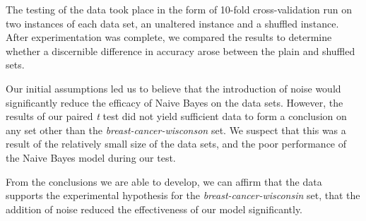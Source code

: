 \documentclass[twoside,11pt]{article}
\begin{document}
	The testing of the data took place in the form of 10-fold cross-validation run on two instances of each data set, an unaltered instance and a shuffled instance. After experimentation was complete, we compared the results to determine whether a discernible difference in accuracy arose between the plain and shuffled sets. 
	
	Our initial assumptions led us to believe that the introduction of noise would significantly reduce the efficacy of Naive Bayes on the data sets. However, the results of our paired \textit{t} test did not yield sufficient data to form a conclusion on any set other than the \textit{breast-cancer-wisconson} set. We suspect that this was a result of the relatively small size of the data sets, and the poor performance of the Naive Bayes model during our test. 
	
	From the conclusions we are able to develop, we can affirm that the data supports the experimental hypothesis for the \textit{breast-cancer-wisconsin} set, that the addition of noise reduced the effectiveness of our model significantly.
	
	\newpage
	\vskip 0.2in
	
	
\end{document}
